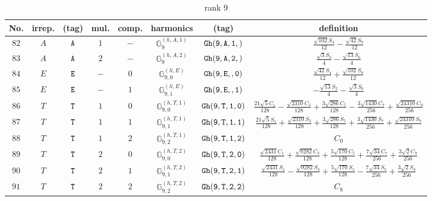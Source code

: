 \documentclass[fleqn,8pt]{jsarticle}
\begin{document}
\begin{table}[ht!]
\begin{center}
\caption{rank 9}
\renewcommand{\arraystretch}{1.3}
\begin{tabular}{cccccccc} \hline \hline
No. & irrep. & (tag) & mul. & comp. & harmonics & (tag) & definition \\ \hline
$ 82 $ & $ A $ & $ {\tt A} $ & $ 1 $ & $ - $ & $ \mathbb{G}_{9}^{(h,A,1)} $ & $ {\tt Gh(9,A,1,)} $ & $ \frac{\sqrt{102} S_{4}}{12} - \frac{\sqrt{42} S_{8}}{12} $ \\
$ 83 $ & $ A $ & $ {\tt A} $ & $ 2 $ & $ - $ & $ \mathbb{G}_{9}^{(h,A,2)} $ & $ {\tt Gh(9,A,2,)} $ & $ \frac{\sqrt{3} S_{2}}{4} - \frac{\sqrt{13} S_{6}}{4} $ \\
$ 84 $ & $ E $ & $ {\tt E} $ & $ - $ & $ 0 $ & $ \mathbb{G}_{9,0}^{(h,E)} $ & $ {\tt Gh(9,E,,0)} $ & $ \frac{\sqrt{42} S_{4}}{12} + \frac{\sqrt{102} S_{8}}{12} $ \\
$ 85 $ & $ E $ & $ {\tt E} $ & $ - $ & $ 1 $ & $ \mathbb{G}_{9,1}^{(h,E)} $ & $ {\tt Gh(9,E,,1)} $ & $ - \frac{\sqrt{13} S_{2}}{4} - \frac{\sqrt{3} S_{6}}{4} $ \\
$ 86 $ & $ T $ & $ {\tt T} $ & $ 1 $ & $ 0 $ & $ \mathbb{G}_{9,0}^{(h,T,1)} $ & $ {\tt Gh(9,T,1,0)} $ & $ \frac{21 \sqrt{5} C_{1}}{128} - \frac{\sqrt{2310} C_{3}}{128} + \frac{3 \sqrt{286} C_{5}}{128} - \frac{3 \sqrt{1430} C_{7}}{256} + \frac{\sqrt{24310} C_{9}}{256} $ \\
$ 87 $ & $ T $ & $ {\tt T} $ & $ 1 $ & $ 1 $ & $ \mathbb{G}_{9,1}^{(h,T,1)} $ & $ {\tt Gh(9,T,1,1)} $ & $ \frac{21 \sqrt{5} S_{1}}{128} + \frac{\sqrt{2310} S_{3}}{128} + \frac{3 \sqrt{286} S_{5}}{128} + \frac{3 \sqrt{1430} S_{7}}{256} + \frac{\sqrt{24310} S_{9}}{256} $ \\
$ 88 $ & $ T $ & $ {\tt T} $ & $ 1 $ & $ 2 $ & $ \mathbb{G}_{9,2}^{(h,T,1)} $ & $ {\tt Gh(9,T,1,2)} $ & $ C_{0} $ \\
$ 89 $ & $ T $ & $ {\tt T} $ & $ 2 $ & $ 0 $ & $ \mathbb{G}_{9,0}^{(h,T,2)} $ & $ {\tt Gh(9,T,2,0)} $ & $ \frac{\sqrt{2431} C_{1}}{128} + \frac{\sqrt{9282} C_{3}}{128} + \frac{5 \sqrt{170} C_{5}}{128} + \frac{7 \sqrt{34} C_{7}}{256} + \frac{3 \sqrt{2} C_{9}}{256} $ \\
$ 90 $ & $ T $ & $ {\tt T} $ & $ 2 $ & $ 1 $ & $ \mathbb{G}_{9,1}^{(h,T,2)} $ & $ {\tt Gh(9,T,2,1)} $ & $ \frac{\sqrt{2431} S_{1}}{128} - \frac{\sqrt{9282} S_{3}}{128} + \frac{5 \sqrt{170} S_{5}}{128} - \frac{7 \sqrt{34} S_{7}}{256} + \frac{3 \sqrt{2} S_{9}}{256} $ \\
$ 91 $ & $ T $ & $ {\tt T} $ & $ 2 $ & $ 2 $ & $ \mathbb{G}_{9,2}^{(h,T,2)} $ & $ {\tt Gh(9,T,2,2)} $ & $ C_{8} $ \\

\end{tabular}
\end{center}
\end{table}
\end{document}
